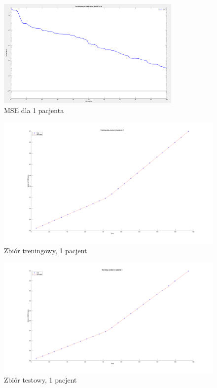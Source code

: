 \documentclass[12pt]{article}
\begin{document}
\begin{figure}[h!]

\centering
\includegraphics[width=0.8\textwidth]{mse-normal-1.png}
\caption{MSE dla 1 pacjenta}

\end{figure}

\begin{figure}[h!]

\includegraphics[width=1.05\textwidth]{training-normal-1.png}
\caption{Zbiór treningowy, 1 pacjent}

\end{figure}

\begin{figure}[h!]

\includegraphics[width=1.05\textwidth]{test-normal-1.png}
\caption{Zbiór testowy, 1 pacjent}

\end{figure}
\end{document}
